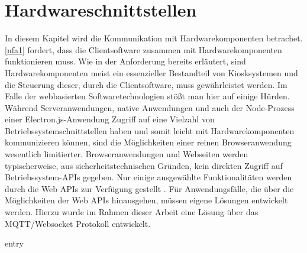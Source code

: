 \chapter{Hardwareschnittstellen}
\label{chap:hardwareschnittstellen}

In diesem Kapitel wird die Kommunikation mit Hardwarekomponenten betrachet.
\ref{nfa1} fordert, dass die Clientsoftware zusammen mit Hardwarekomponenten funktionieren muss. Wie in
der Anforderung bereits erläutert, sind Hardwarekomponenten meist ein essenzieller Bestandteil von Kiosksystemen
und die Steuerung dieser, durch die Clientsoftware, muss gewährleistet werden. Im Falle der webbasierten 
Softwaretechnologien stößt man hier auf einige Hürden.\\
Während Serveranwendungen, native Anwendungen und auch der Node-Prozess einer 
Electron.js-Anwendung Zugriff auf eine Vielzahl von Betriebssystemschnittstellen haben 
und somit leicht mit Hardwarekomponenten kommunizieren können, sind
die Möglichkeiten einer reinen Browseranwendung wesentlich limitierter. Browseranwendungen und Webseiten werden
typischerweise, aus sicherheitstechnischen Gründen, kein direkten Zugriff auf Betriebssystem-APIs gegeben.
Nur einige ausgewählte Funktionalitäten werden durch die Web APIs zur Verfügung gestellt \cite{web-apis}.
Für Anwendungsfälle, die über die Möglichkeiten der Web APIs hinausgehen, müssen eigene Lösungen entwickelt 
werden. Hierzu wurde im Rahmen dieser Arbeit eine Lösung über das MQTT/Websocket Protokoll entwickelt.


{entry}